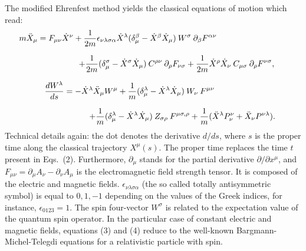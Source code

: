 \documentclass[12pt]{article}
\begin{document}
The modified Ehrenfest method yields the classical equations of motion which read: 
\[\hspace*{-3cm} m \ddot{X}_{\mu} = F_{\mu\nu}\dot{X}^{\nu}+ \frac{1}{2m} \epsilon_{\nu\lambda\sigma\alpha}\dot{X}^{\lambda} (\delta^{\beta}_{\mu}- \dot{X}^{\beta} \dot{X}_{\mu}) \:W^{\sigma} \:\partial_{\beta}F^{\alpha\nu} \] 

\vspace*{-0.4cm}
\begin{equation} \hspace*{2.0cm} + \frac{1}{2m} (\delta^{\sigma}_{\mu}- \dot{X}^{\sigma} \dot{X}_{\mu}) \:C^{\rho\nu}\: \partial_{\rho}F_{\nu\sigma} + \frac{1}{2m} \dot{X}^{\rho} \dot{X}_{\nu} \: C_{\mu\sigma}\:\partial_{\rho} F^{\nu\sigma}, \end{equation}

\vspace*{-0.3cm}
\[ \frac{dW^{\lambda}}{ds} = - \dot{X}^{\lambda} \ddot{X}_{\mu}W^{\mu} + \frac{1}{m} (\delta^{\lambda}_{\mu}- \dot{X}^{\lambda} \dot{X}_{\mu}) \:W_{\nu}\:F^{\mu\nu} \hspace*{2cm} \] 

\vspace*{-0.4cm}
 \begin{equation} \hspace*{2.5cm} + \frac{1}{m} (\delta^{\lambda}_{\mu}- \dot{X}^{\lambda} \dot{X}_{\mu})\:Z_{\sigma \rho}\: F^{\mu\sigma,\rho} + \frac{1}{m} (\ddot{X}^{\lambda} P^{\nu}_{\nu} + \ddot{X}_{\nu}P^{\nu\lambda}). \end{equation}
Technical details again: the dot denotes the derivative $d/ ds$, where $s$ is the proper time along the classical trajectory $X^{\mu}(s)$. The proper time replaces the time $t$ present in Eqs.\ (2). Furthermore, $\partial_{\mu}$ stands for the partial derivative $\partial/ \partial x^{\mu}$, and 
$F_{\mu\nu} = \partial_{\mu} A_{\nu} - \partial_{\nu} A_{\mu} $ is the electromagnetic field strength tensor. It is composed of the electric and magnetic fields. $\epsilon_{\nu\lambda \sigma \alpha}$ (the so called totally antisymmetric symbol) is equal to $0, 1, -1$ depending on the values of the Greek indices, for instance, $\epsilon_{0123} =1$. 
The spin four-vector $ W^{\sigma}$ is related to the expectation value of the quantum spin operator. In the particular case of constant electric and magnetic fields, equations (3) and (4) reduce to the well-known Bargmann-Michel-Telegdi equations for a relativistic particle with spin. 

 
\end{document}
